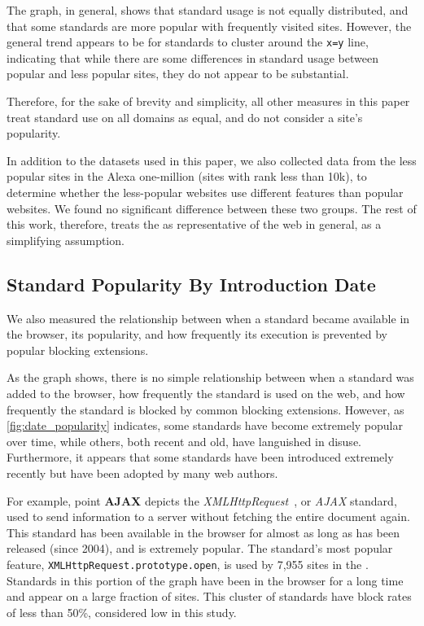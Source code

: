 The graph, in general, shows that standard usage is not equally distributed,
and that some standards are more popular with frequently visited sites.
However, the general trend appears to be for standards to cluster around the
\texttt{x=y} line, indicating that while there are some differences in standard
usage between popular and less popular sites, they do not appear to be
substantial.

Therefore, for the sake of brevity and simplicity, all other measures in this
paper treat standard use on all domains as equal, and do not consider a site's
popularity.

In addition to the datasets used in this paper, we also collected data
from the less popular sites in the Alexa one-million (sites with rank less
than 10k), to determine whether the less-popular websites use different
features than popular websites.  We found no significant difference
between these two groups.  The rest of this work, therefore, treats the \ATK as
representative of the web in general, as a simplifying assumption.


\subsection{Standard Popularity By Introduction Date}

We also measured the relationship between when a standard became available in
the browser, its popularity, and how frequently its execution is prevented by
popular blocking extensions.

As the graph shows, there is no simple relationship between when a standard was
added to the browser, how frequently the standard is used on the web, and how
frequently the standard is blocked by common blocking extensions.  However, as
\ref{fig:date_popularity} indicates, some standards have become extremely
popular over time, while others, both recent and old, have languished in
disuse. Furthermore, it appears that some standards have been introduced
extremely recently but have been adopted by many web authors.

For example, point \textbf{AJAX} depicts the
\textit{XMLHttpRequest}~\cite{ajaxwhatwg}, or \textit{AJAX} standard, used to
send information to a server without fetching the entire document again.  This
standard has been available in the browser for almost as long as \FF has been
released (since 2004), and is extremely popular. The standard's most popular
feature, \texttt{XMLHttpRequest.prototype.open}, is used by 7,955 sites in the
\ATK.  Standards in this portion of the graph have been in the browser for
a long time and appear on a large fraction of sites.  This cluster of
standards have block rates of less than 50\%, considered low in this study.

